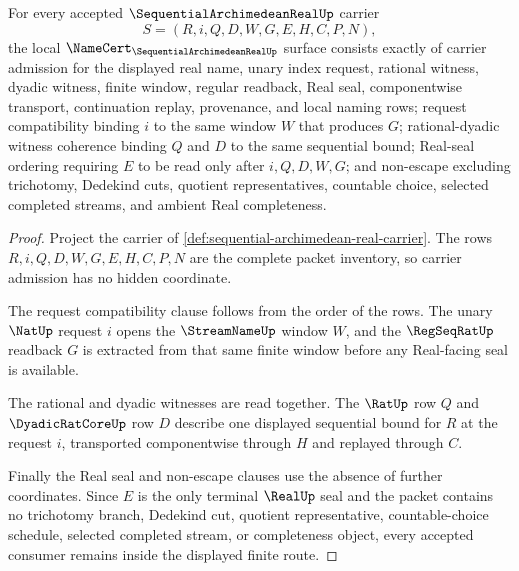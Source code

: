 \begin{theorem}
\label{thm:sequential-archimedean-real-namecert-obligations}
For every accepted $\SequentialArchimedeanRealUp$ carrier
$$
S=(R,i,Q,D,W,G,E,H,C,P,N),
$$
the local $\NameCert_{\SequentialArchimedeanRealUp}$ surface consists exactly of carrier admission for the displayed real name, unary index request, rational witness, dyadic witness, finite window, regular readback, Real seal, componentwise transport, continuation replay, provenance, and local naming rows; request compatibility binding $i$ to the same window $W$ that produces $G$; rational-dyadic witness coherence binding $Q$ and $D$ to the same sequential bound; Real-seal ordering requiring $E$ to be read only after $i,Q,D,W,G$; and non-escape excluding trichotomy, Dedekind cuts, quotient representatives, countable choice, selected completed streams, and ambient Real completeness.
\end{theorem}
\begin{proof}
Project the carrier of \autoref{def:sequential-archimedean-real-carrier}. The rows $R,i,Q,D,W,G,E,H,C,P,N$ are the complete packet inventory, so carrier admission has no hidden coordinate.

The request compatibility clause follows from the order of the rows. The unary $\NatUp$ request $i$ opens the $\StreamNameUp$ window $W$, and the $\RegSeqRatUp$ readback $G$ is extracted from that same finite window before any Real-facing seal is available.

The rational and dyadic witnesses are read together. The $\RatUp$ row $Q$ and $\DyadicRatCoreUp$ row $D$ describe one displayed sequential bound for $R$ at the request $i$, transported componentwise through $H$ and replayed through $C$.

Finally the Real seal and non-escape clauses use the absence of further coordinates. Since $E$ is the only terminal $\RealUp$ seal and the packet contains no trichotomy branch, Dedekind cut, quotient representative, countable-choice schedule, selected completed stream, or completeness object, every accepted consumer remains inside the displayed finite route.
\end{proof}


